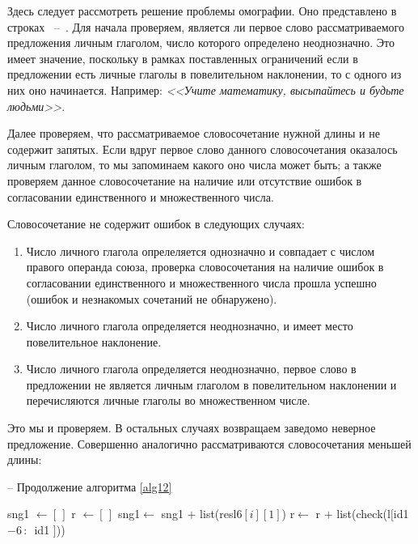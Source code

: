 \documentclass[main]{subfiles}
\begin{document}
Здесь следует рассмотреть решение проблемы омографии. Оно представлено в строках ~--~. Для начала проверяем, является ли первое слово рассматриваемого предложения личным глаголом, число которого определено неоднозначно. Это имеет значение, поскольку в рамках поставленных ограничений если в предложении есть личные глаголы в повелительном наклонении, то с одного из них оно начинается. Например: \textit{<<Учите математику, высыпайтесь и будьте людьми>>}.

Далее проверяем, что рассматриваемое словосочетание нужной длины и не содержит запятых. Если вдруг первое слово данного словосочетания оказалось личным глаголом, то мы запоминаем какого оно числа может быть; а также проверяем данное словосочетание на наличие или отсутствие ошибок в согласовании единственного и множественного числа.

Словосочетание не содержит ошибок в следующих случаях:\begin{enumerate}
	\item Число личного глагола опрелеляется однозначно и совпадает с числом правого операнда союза, проверка словосочетания на наличие ошибок в согласовании единственного и множественного числа прошла успешно (ошибок и незнакомых сочетаний не обнаружено).
	\item Число личного глагола определяется неоднозначно, и имеет место повелительное наклонение.
	\item Число личного глагола определяется неоднозначно, первое слово в предложении не является личным глаголом в повелительном наклонении и перечисляются личные глаголы во множественном числе.
\end{enumerate}

Это мы и проверяем. В остальных случаях возвращаем заведомо неверное предложение. Совершенно аналогично рассматриваются словосочетания меньшей длины:

\begin{algorithm}
	\caption{-- Продолжение алгоритма \ref{alg12}}\label{alg13}
	\begin{algorithmic}[1]
		\State sng1 $\gets [\, ]$ 
		\State r $\gets [\, ]$ 
		\State sng1$\gets$ sng1 $+$ list(resl6$[i][1]$)
		\State r$\gets$ r $+$ list(check(l$[$id1$-6\, :\, $ id1 $]$))
		\EndIf
		\EndFor
	\end{algorithmic}
\end{algorithm}
\end{document}
